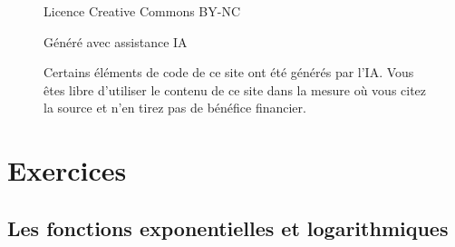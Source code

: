 \documentclass[
  12pt,
  letterpaper,
]{book}
\theoremstyle{remark}
\begin{document}
\begin{figure}

\begin{minipage}[t]{0.77\linewidth}

{\centering 


\caption{Licence Creative Commons BY-NC}

}

\end{minipage}%
%
\begin{minipage}[t]{0.23\linewidth}

{\centering 


\caption{Généré avec assistance IA}

}

\end{minipage}%

\caption{\label{fig-ccIA}Certains éléments de code de ce site ont été
générés par l'IA. Vous êtes libre d'utiliser le contenu de ce site dans
la mesure où vous citez la source et n'en tirez pas de bénéfice
financier.}

\end{figure}

\part{Exercices}

\hypertarget{les-fonctions-exponentielles-et-logarithmiques-1}{%
\chapter{Les fonctions exponentielles et
logarithmiques}\label{les-fonctions-exponentielles-et-logarithmiques-1}}
\end{document}
